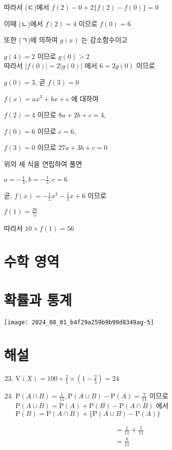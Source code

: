\documentclass[10pt]{article}
\begin{document}
따라서 (ㄷ)에서 $f(2)-0+2\{f(2)-f(0)\}=0$

이때 (ㄴ)에서 $f(2)=4$ 이므로 $f(0)=6$

또한 (ㄱ)에 의하여 $g(x)$ 는 감소함수이고

$g(4)=2$ 이므로 $g(0)>2$\\
따라서 $|f(0)|=2|g(0)|$ 에서 $6=2 g(0)$ 이므로

$g(0)=3$, 곧 $f(3)=0$

$f(x)=a x^{3}+b x+c$ 에 대하여

$f(2)=4$ 이므로 $8 a+2 b+c=4$,

$f(0)=6$ 이므로 $c=6$,

$f(3)=0$ 이므로 $27 a+3 b+c=0$

위의 세 식을 연립하여 풀면

$a=-\frac{1}{5}, b=-\frac{1}{5}, c=6$

곧, $f(x)=-\frac{1}{5} x^{3}-\frac{1}{5} x+6$ 이므로

$f(1)=\frac{28}{5}$

따라서 $10 \times f(1)=56$

\section*{수학 영역}
\section*{확률과 통계}
\begin{center}
\texttt{[image: 2024\_08\_01\_b4f29a259b9b99d8349ag-5]}
\end{center}

\section*{해설}
\begin{enumerate}
  \setcounter{enumi}{22}
  \item $\mathrm{V}(X)=100 \times \frac{2}{5} \times\left(1-\frac{2}{5}\right)=24$

  \item $\mathrm{P}(A \cap B)=\frac{1}{11}, \mathrm{P}(A \cup B)-\mathrm{P}(A)=\frac{7}{11}$ 이므로 $\mathrm{P}(A \cup B)=\mathrm{P}(A)+\mathrm{P}(B)-\mathrm{P}(A \cap B)$ 에서 $\mathrm{P}(B)=\mathrm{P}(A \cap B)+\{\mathrm{P}(A \cup B)-\mathrm{P}(A)\}$

\end{enumerate}

\[
\begin{aligned}
& =\frac{1}{11}+\frac{7}{11} \\
& =\frac{8}{11}
\end{aligned}
\]
\end{document}
